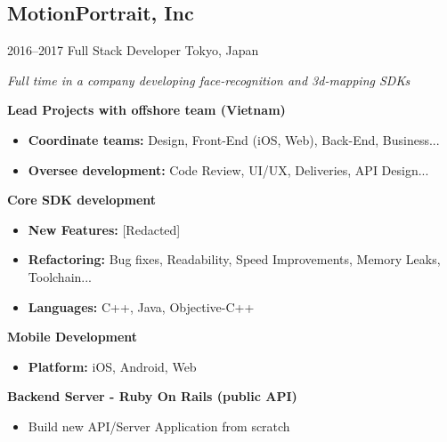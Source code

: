 \documentclass[]{template/friggeri-cv} %
\begin{document}
\subsection{MotionPortrait, Inc}
\begin{entrylist}


\entry
{2016--2017}
{Full Stack Developer}
{Tokyo, Japan}
{\emph{Full time in a company developing face-recognition and 3d-mapping SDKs}

\textbf{Lead Projects with offshore team (Vietnam)} 
\begin{itemize}
\item \textbf{Coordinate teams:} Design, Front-End (iOS, Web), Back-End, Business...
\item \textbf{Oversee development:} Code Review, UI/UX, Deliveries, API Design...
\end{itemize}
\textbf{Core SDK development} 
\begin{itemize}
\item \textbf{New Features:} [Redacted]
\item \textbf{Refactoring:} Bug fixes, Readability, Speed Improvements, Memory Leaks, Toolchain...
\item \textbf{Languages:} C++, Java, Objective-C++

\end{itemize}
\textbf{Mobile Development} 
\begin{itemize}
\item \textbf{Platform:} iOS, Android, Web
\end{itemize}

\textbf{Backend Server - Ruby On Rails (public API)} 
\begin{itemize}
\item Build new API/Server Application from scratch
\end{itemize}
}
\end{entrylist}



\end{document}
